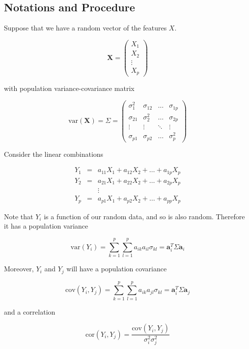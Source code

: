 \documentclass[]{book}
\begin{document}
\subsection*{Notations and Procedure}\label{notations-and-procedure}

Suppose that we have a random vector of the features \(X\).

\[ \textbf{X} = \left(\begin{array}{c} X_1\\ X_2\\ \vdots \\X_p\end{array}\right) \]

with population variance-covariance matrix

\[ \text{var}(\textbf{X}) = \Sigma = \left(\begin{array}{cccc}\sigma^2_1 & \sigma_{12} & \dots &\sigma_{1p}\\ \sigma_{21} & \sigma^2_2 & \dots &\sigma_{2p}\\  \vdots & \vdots & \ddots & \vdots \\ \sigma_{p1} & \sigma_{p2} & \dots & \sigma^2_p\end{array}\right) \]

Consider the linear combinations

\[ \begin{array}{lll} Y_1 & = & a_{11}X_1 + a_{12}X_2 + \dots + a_{1p}X_p \\ Y_2 & = & a_{21}X_1 + a_{22}X_2 + \dots + a_{2p}X_p \\ & & \vdots \\ Y_p & = & a_{p1}X_1 + a_{p2}X_2 + \dots +a_{pp}X_p \end{array} \]

Note that \(Y_i\) is a function of our random data, and so is also
random. Therefore it has a population variance

\[ \text{var}(Y_i) = \sum_{k=1}^{p} \sum_{l=1}^{p} a_{ik} a_{il} \sigma_{kl} = \mathbf{a}^T_i \Sigma \mathbf{a}_i \]

Moreover, \(Y_i\) and \(Y_j\) will have a population covariance

\[ \text{cov}(Y_i, Y_j) = \sum_{k=1}^{p} \sum_{l=1}^{p} a_{ik}a_{jl}\sigma_{kl} = \mathbf{a}^T_i\Sigma\mathbf{a}_j \]

and a correlation

\[ \text{cor}(Y_i, Y_j) = \frac{\text{cov}(Y_i, Y_j)}{\sigma^2_i \sigma^2_j}\]
\end{document}
